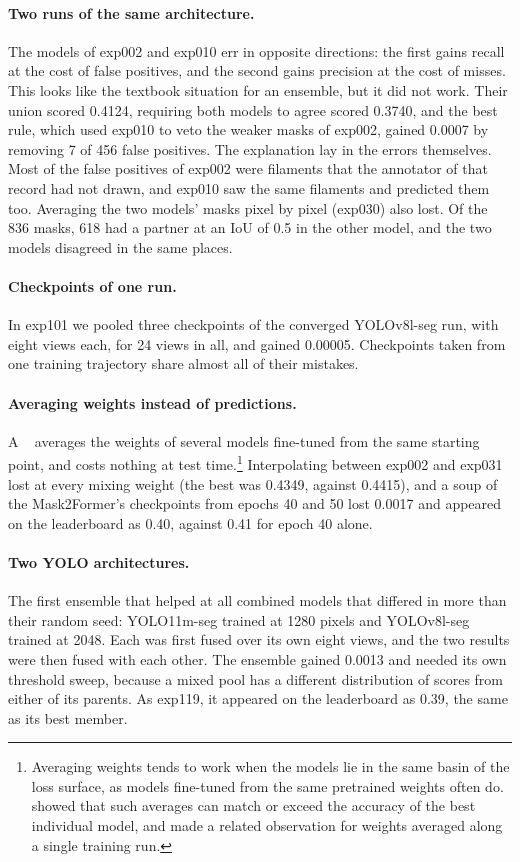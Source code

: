 \paragraph{Two runs of the same architecture.} The models of exp002 and exp010 err in opposite
directions: the first gains recall at the cost of false positives, and the second gains precision at
the cost of misses. This looks like the textbook situation for an ensemble, but it did not work.
Their union scored 0.4124, requiring both models to agree scored 0.3740, and the best rule, which
used exp010 to veto the weaker masks of exp002, gained 0.0007 by removing 7 of 456 false positives.
The explanation lay in the errors themselves. Most of the false positives of exp002 were filaments
that the annotator of that record had not drawn, and exp010 saw the same filaments and predicted
them too. Averaging the two models' masks pixel by pixel (exp030) also lost. Of the 836 masks, 618
had a partner at an IoU of 0.5 in the other model, and the two models disagreed in the same places.

\paragraph{Checkpoints of one run.} In exp101 we pooled three checkpoints of the converged
YOLOv8l-seg run, with eight views each, for 24 views in all, and gained 0.00005. Checkpoints taken
from one training trajectory share almost all of their mistakes.

\paragraph{Averaging weights instead of predictions.} A ~\citep{soups} averages
the weights of several models fine-tuned from the same starting point, and costs nothing at test
time.\footnote{Averaging weights tends to work when the models lie in the same basin of the loss
surface, as models fine-tuned from the same pretrained weights often do. \citet{soups} showed that
such averages can match or exceed the accuracy of the best individual model, and
\citet{izmailov2018} made a related observation for weights averaged along a single training
run.} Interpolating between exp002 and exp031 lost at every mixing weight (the best was 0.4349,
against 0.4415), and a soup of the Mask2Former's checkpoints from epochs 40 and 50 lost 0.0017 and
appeared on the leaderboard as 0.40, against 0.41 for epoch 40 alone.

\paragraph{Two YOLO architectures.} The first ensemble that helped at all combined models that
differed in more than their random seed: YOLO11m-seg trained at 1280 pixels and YOLOv8l-seg trained
at 2048. Each was first fused over its own eight views, and the two results were then fused with each
other. The ensemble gained 0.0013 and needed its own threshold sweep, because a mixed pool has a
different distribution of scores from either of its parents. As exp119, it appeared on the
leaderboard as 0.39, the same as its best member.

